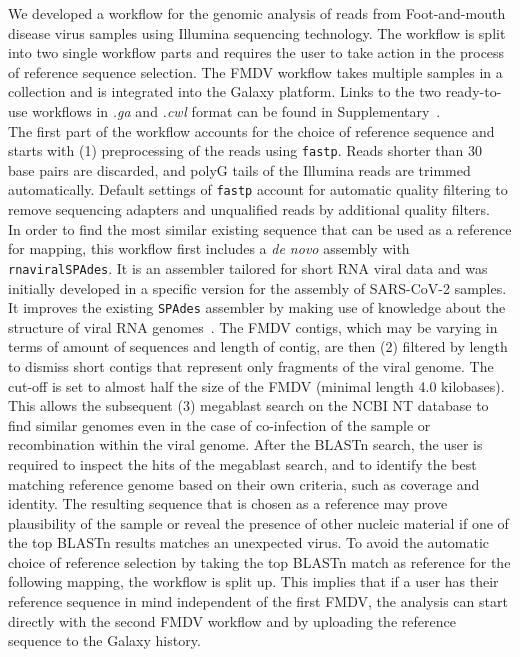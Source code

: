 We developed a workflow for the genomic analysis of reads from Foot-and-mouth disease virus samples using Illumina sequencing technology. The workflow is split into two single workflow parts and requires the user to take action in the process of reference sequence selection. The \ac{FMDV} workflow takes multiple samples in a collection and is integrated into the Galaxy platform. Links to the two ready-to-use workflows in \textit{.ga} and \textit{.cwl} format can be found in Supplementary~. \\

The first part of the workflow accounts for the choice of reference sequence and starts with (1) preprocessing of the reads using \texttt{fastp}. Reads shorter than 30 base pairs are discarded, and polyG tails of the Illumina reads are trimmed automatically. Default settings of \texttt{fastp} account for automatic quality filtering to remove sequencing adapters and unqualified reads by additional quality filters. \\
In order to find the most similar existing sequence that can be used as a reference for mapping, this workflow first includes a \textit{de novo} assembly with \texttt{rnaviralSPAdes}. It is an assembler tailored for short \ac{RNA} viral data and was initially developed in a specific version for the assembly of \ac{SARS-CoV-2} samples. It improves the existing \texttt{SPAdes} assembler by making use of knowledge about the structure of viral \ac{RNA} genomes~\cite{meleshko2022coronaspades}. The \ac{FMDV} contigs, which may be varying in terms of amount of sequences and length of contig, are then (2) filtered by length to dismiss short contigs that represent only fragments of the viral genome. The cut-off is set to almost half the size of the \ac{FMDV} (minimal length 4.0 kilobases). This allows the subsequent (3) megablast search on the \ac{NCBI} NT database to find similar genomes even in the case of co-infection of the sample or recombination within the viral genome. After the \ac{BLAST}n search, the user is required to inspect the hits of the megablast search, and to identify the best matching reference genome based on their own criteria, such as coverage and identity. The resulting sequence that is chosen as a reference may prove plausibility of the sample or reveal the presence of other nucleic material if one of the top \ac{BLAST}n results matches an unexpected virus. To avoid the automatic choice of reference selection by taking the top \ac{BLAST}n match as reference for the following mapping, the workflow is split up. This implies that if a user has their reference sequence in mind independent of the first \ac{FMDV}, the analysis can start directly with the second \ac{FMDV} workflow and by uploading the reference sequence to the Galaxy history.

